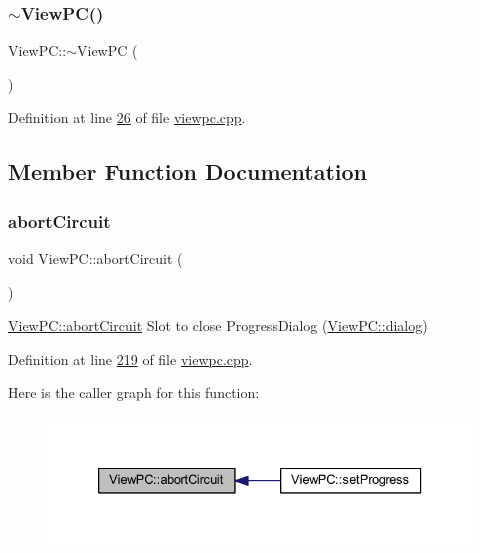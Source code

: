 \subsubsection{\texorpdfstring{$\sim$\+View\+P\+C()}{~ViewPC()}}
{\footnotesize\ttfamily View\+P\+C\+::$\sim$\+View\+PC (\begin{DoxyParamCaption}{ }\end{DoxyParamCaption})}



Definition at line \mbox{\hyperlink{viewpc_8cpp_source_l00026}{26}} of file \mbox{\hyperlink{viewpc_8cpp_source}{viewpc.\+cpp}}.



\subsection{Member Function Documentation}
\mbox{\label{class_view_p_c_ad7ba2fcf1d17862de15e32432823f7b0}} 
\subsubsection{\texorpdfstring{abort\+Circuit}{abortCircuit}}
{\footnotesize\ttfamily void View\+P\+C\+::abort\+Circuit (\begin{DoxyParamCaption}{ }\end{DoxyParamCaption})\hspace{0.3cm}{\ttfamily [slot]}}



\mbox{\hyperlink{class_view_p_c_ad7ba2fcf1d17862de15e32432823f7b0}{View\+P\+C\+::abort\+Circuit}} Slot to close Progress\+Dialog (\mbox{\hyperlink{class_view_p_c_a31abbb470fe329b44e6ffee202b903ca}{View\+P\+C\+::dialog}}) 



Definition at line \mbox{\hyperlink{viewpc_8cpp_source_l00219}{219}} of file \mbox{\hyperlink{viewpc_8cpp_source}{viewpc.\+cpp}}.

Here is the caller graph for this function\+:
\nopagebreak
\begin{figure}[H]
\begin{center}
\leavevmode
\includegraphics[width=333pt]{class_view_p_c_ad7ba2fcf1d17862de15e32432823f7b0_icgraph}
\end{center}
\end{figure}
\mbox{\label{class_view_p_c_a863f5233af3791bd165a2811a5d9bcc2}} 
